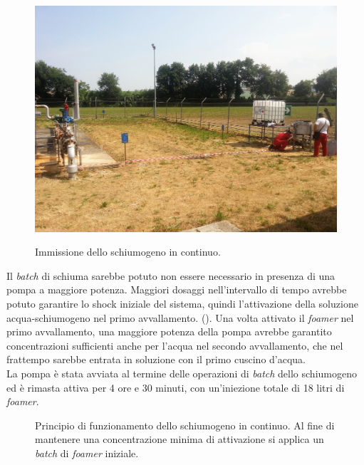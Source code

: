 \begin{figure}[htbp]
    {\includegraphics[height=.27\textheight]{fig/test/continuo-2} \label{fig:test-continuo-linea}}
\caption{Immissione dello schiumogeno in continuo.}
\label{fig:test-continuo}
\end{figure}
Il \textit{batch} di schiuma sarebbe potuto non essere necessario in presenza di una pompa a maggiore potenza. Maggiori dosaggi nell'intervallo di tempo avrebbe potuto garantire lo shock iniziale del sistema, quindi l'attivazione della soluzione acqua-schiumogeno nel primo avvallamento. (). Una volta attivato il \textit{foamer} nel primo avvallamento, una maggiore potenza della pompa avrebbe garantito concentrazioni sufficienti anche per l'acqua nel secondo avvallamento, che nel frattempo sarebbe entrata in soluzione con il primo cuscino d'acqua.\\
La pompa è stata avviata al termine delle operazioni di \textit{batch} dello schiumogeno ed è rimasta attiva per 4 ore e 30 minuti, con un'iniezione totale di 18 litri di \textit{foamer}.

\begin{figure}[htbp]
    \centering
     \qquad
\caption{Principio di funzionamento dello schiumogeno in continuo. Al fine di mantenere una concentrazione minima di attivazione si applica un \textit{batch} di \textit{foamer} iniziale.}
\label{fig:continuo-model}
\end{figure}

